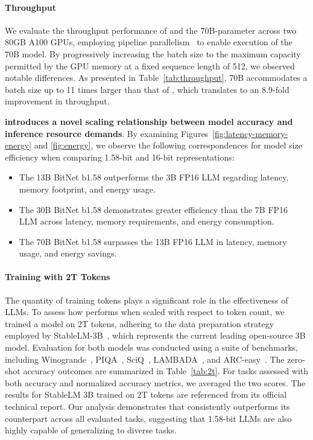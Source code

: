 \paragraph{Throughput}

We evaluate the throughput performance of  and the 70B-parameter  across two 80GB A100 GPUs, employing pipeline parallelism~\cite{gpipe} to enable execution of the  70B model. By progressively increasing the batch size to the maximum capacity permitted by the GPU memory at a fixed sequence length of 512, we observed notable differences. As presented in Table~\ref{tab:throughput},  70B accommodates a batch size up to 11 times larger than that of , which translates to an 8.9-fold improvement in throughput.

\textbf{ introduces a novel scaling relationship between model accuracy and inference resource demands}. By examining Figures~\ref{fig:latency-memory-energy} and \ref{fig:energy}, we observe the following correspondences for model size efficiency when comparing 1.58-bit and 16-bit representations:

\begin{itemize}
    \item The 13B BitNet b1.58 outperforms the 3B FP16 LLM regarding latency, memory footprint, and energy usage.
    \item The 30B BitNet b1.58 demonstrates greater efficiency than the 7B FP16 LLM across latency, memory requirements, and energy consumption.
    \item The 70B BitNet b1.58 surpasses the 13B FP16 LLM in latency, memory usage, and energy savings.
\end{itemize}

\paragraph{Training with 2T Tokens}

The quantity of training tokens plays a significant role in the effectiveness of LLMs. To assess how  performs when scaled with respect to token count, we trained a  model on 2T tokens, adhering to the data preparation strategy employed by StableLM-3B~\cite{StableLM-3B-4E1T}, which represents the current leading open-source 3B model. Evaluation for both models was conducted using a suite of benchmarks, including Winogrande~\cite{winoGrande}, PIQA~\cite{piqa}, SciQ~\cite{sciq}, LAMBADA~\cite{lambada}, and ARC-easy~\cite{arc}. The zero-shot accuracy outcomes are summarized in Table~\ref{tab:2t}. For tasks assessed with both accuracy and normalized accuracy metrics, we averaged the two scores. The results for StableLM 3B trained on 2T tokens are referenced from its official technical report. Our analysis demonstrates that  consistently outperforms its counterpart across all evaluated tasks, suggesting that 1.58-bit LLMs are also highly capable of generalizing to diverse tasks.

